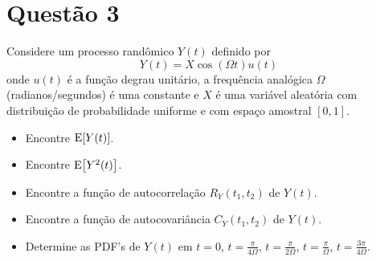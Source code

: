 \section{Questão 3}

Considere um processo randômico $Y(t)$ definido por
$$Y(t) = X\cos(\Omega t)u(t)$$
onde $u(t)$ é a função degrau unitário, a frequência analógica $\Omega$ (radianos/segundos) é uma constante e $X$ é uma
variável aleatória com distribuição de probabilidade uniforme e com espaço amostral $[0, 1]$.

\begin{itemize}
    \item [a)] Encontre $\mathrm{E}\!\left[Y(t)\right]$.
    \item [b)] Encontre $\mathrm{E}\!\left[Y^2(t)\right]$.
    \item [c)] Encontre a função de autocorrelação $R_Y(t_1, t_2)$ de $Y(t)$.
    \item [d)] Encontre a função de autocovariância $C_Y(t_1, t_2)$ de $Y(t)$.
    \item [e)] Determine as PDF's de $Y(t)$ em 
    $t = 0$, 
    $t = \frac{\pi}{4\Omega}$, 
    $t = \frac{\pi}{2\Omega}$, 
    $t = \frac{\pi}{\Omega}$, 
    $t = \frac{3\pi}{4\Omega}$.
\end{itemize}

